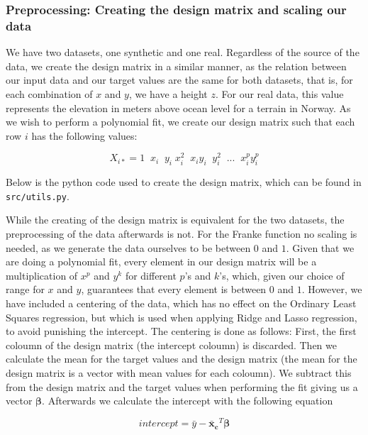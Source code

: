 \documentclass[twocolumn,10pt,cleanfoot]{asme2ej}
\begin{document}
\subsubsection{Preprocessing: Creating the design matrix and scaling our data}
We have two datasets, one synthetic and one real. Regardless of the source of the data, we create the design matrix in a similar manner, as the relation between our input data and our target values are the same for both datasets, that is, for each combination of $x$ and $y$, we have a height $z$. For our real data, this value represents the elevation in meters above ocean level for a terrain in Norway. As we wish to perform a polynomial fit, we create our design matrix such that each row $i$ has the following values:

\begin{equation}
X_{i*} = 1 \;\; x_i \;\; y_i \; x_i^2 \;\; x_i y_i \;\; y_i^2 \;\; ... \;\; x_i^p y_i^p
\end{equation}

Below is the python code used to create the design matrix, which can be found in \texttt{src/utils.py}.



While the creating of the design matrix is equivalent for the two datasets, the preprocessing of the data afterwards is not. For the Franke function no scaling is needed, as we generate the data ourselves to be between $0$ and $1$. Given that we are doing a polynomial fit, every element in our design matrix will be a multiplication of $x^p$ and $y^k$ for different $p$'s and $k$'s, which, given our choice of range for $x$ and $y$, guarantees that every element is between $0$ and $1$. However, we have included a centering of the data, which has no effect on the Ordinary Least Squares regression, but which is used when applying Ridge and Lasso regression, to avoid punishing the intercept. The centering is done as follows: First, the first coloumn of the design matrix (the intercept coloumn) is discarded. Then we calculate the mean for the target values and the design matrix (the mean for the design matrix is a vector with mean values for each coloumn). We subtract this from the design matrix and the target values when performing the fit giving us a vector $\bm{\beta}$. Afterwards we calculate the intercept with the following equation

\begin{equation}
	intercept = \bar{y} - \bm{\bar{x}_c}^T \bm{\beta}
\end{equation}
\end{document}

